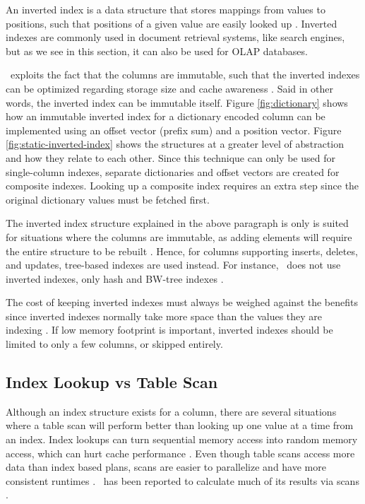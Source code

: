 An inverted index is a data structure that stores mappings from values to positions, such that positions of a given value are easily looked up \cite{Wikipedia_contributors2015-gt}. Inverted indexes are commonly used in document retrieval systems, like search engines, but as we see in this section, it can also be used for OLAP databases.

\hyrise~exploits the fact that the columns are immutable, such that the inverted indexes can be optimized regarding storage size and cache awareness \cite{Schwalb2014-hn}. Said in other words, the inverted index can be immutable itself. Figure \ref{fig:dictionary} shows how an immutable inverted index for a dictionary encoded column can be implemented using an offset vector (prefix sum) and a position vector. Figure \ref{fig:static-inverted-index} shows the structures at a greater level of abstraction and how they relate to each other. Since this technique can only be used for single-column indexes, separate dictionaries and offset vectors are created for composite indexes. Looking up a composite index requires an extra step since the original dictionary values must be fetched first.

The inverted index structure explained in the above paragraph is only is suited for situations where the columns are immutable, as adding elements will require the entire structure to be rebuilt \cite{Schwalb2014-hn}. Hence, for columns supporting inserts, deletes, and updates, tree-based indexes are used instead. For instance, \mssql~does not use inverted indexes, only hash and BW-tree indexes \cite{noauthor_undated-vg, Delaney2014-ip}.

The cost of keeping inverted indexes must always be weighed against the benefits \cite{Lemke2010-is} since inverted indexes normally take more space than the values they are indexing \cite{Moffat1992-tz}. If low memory footprint is important, inverted indexes should be limited to only a few columns, or skipped entirely.

\subsection{Index Lookup vs Table Scan}
\label{sub:Index Lookup vs Table Scan}
Although an index structure exists for a column, there are several situations where a table scan will perform better than looking up one value at a time from an index. Index lookups can turn sequential memory access into random memory access, which can hurt cache performance \cite{Boncz2002-yj}. Even though table scans access more data than index based plans, scans are easier to parallelize and have more consistent runtimes \cite{Raman2008-gi}. \qlikview~has been reported to calculate much of its results via scans \cite{noauthor_undated-js}.

